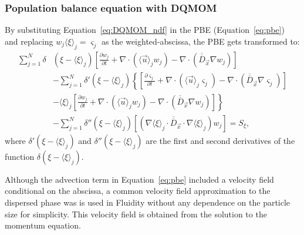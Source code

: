 \subsubsection{Population balance equation with DQMOM}
By substituting Equation~\eqref{eq:DQMOM_ndf} in the PBE (Equation~\eqref{eq:pbe}) and replacing $w_{j} \langle \xi \rangle_{j} = \varsigma_{j}$ as the weighted-abscissa, the PBE gets transformed to:
\begin{equation} \label{eq:dqmomdiff}
\begin{split}
\sum_{j=1}^N \delta&(\xi - \langle \xi \rangle_{j}) \left[ \frac{\partial w_{j}}{\partial t} + 
\nabla \cdot \left( \langle \vec{u} \rangle_j w_j \right) - 
\nabla \cdot \left( \overline{\overline{D}}_{\vec{x}} \nabla w_j \right)
 \right]\\
&- \sum_{j=1}^N \delta'(\xi - \langle \xi \rangle_{j}) \left\{ \left[ \frac{\partial \varsigma_{j}}{\partial t} + 
\nabla \cdot \left( \langle \vec{u} \rangle_j \varsigma_j \right)
 - 
 \nabla \cdot \left( \overline{\overline{D}}_{\vec{x}} \nabla \varsigma_j \right) \right]
  \right.\\
&- \left.\langle \xi \rangle_{j} \left[ \frac{\partial w_{j}}{\partial t} + 
\nabla \cdot \left( \langle \vec{u} \rangle_j w_j \right)
 - 
 \nabla \cdot \left( \overline{\overline{D}}_{\vec{x}} \nabla w_j \right)
  \right] \right\}\\
&- \sum_{j=1}^N \delta''(\xi - \langle \xi \rangle_{j}) \left[ \left( \nabla \langle \xi \rangle_j \cdot \overline{\overline{D}}_{\vec{x}} \cdot \nabla \langle \xi \rangle_j \right) w_j \right] = S_{\xi},
\end{split}
\end{equation}
where $\delta'(\xi - \langle \xi \rangle_{j})$ and $\delta''(\xi - \langle \xi \rangle_{j})$ are the first and second derivatives of the function $\delta(\xi - \langle \xi \rangle_{j})$.

Although the advection term in Equation~\eqref{eq:pbe} included a velocity field conditional on the abscissa, a common velocity field approximation to the dispersed phase was is used in Fluidity without any dependence on the particle size for simplicity. This velocity field is obtained from the solution to the momentum equation.

